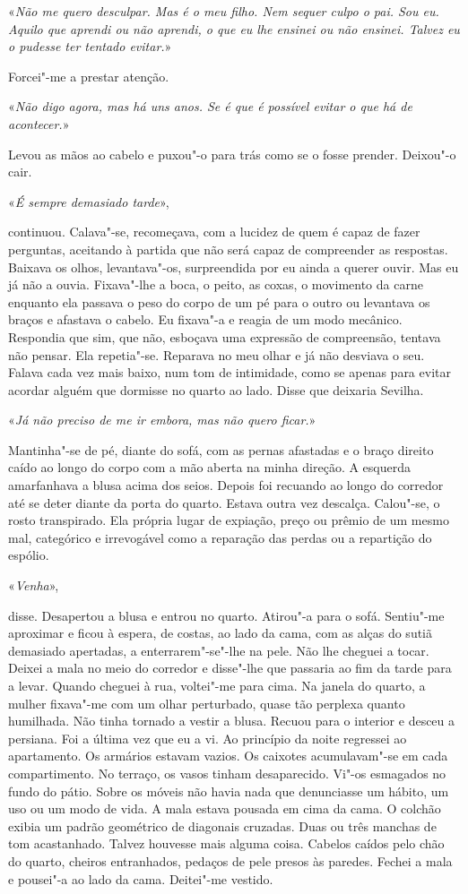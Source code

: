 «\emph{Não me quero desculpar. Mas é o meu filho. Nem sequer culpo o
pai. Sou eu. Aquilo que aprendi ou não aprendi, o que eu lhe ensinei ou
não ensinei. Talvez eu o pudesse ter tentado evitar.}»

Forcei"-me a prestar atenção.

«\emph{Não digo agora, mas há uns anos. Se é que é possível evitar o que
há de acontecer.}»

Levou as mãos ao cabelo e puxou"-o para trás como se o fosse prender.
Deixou"-o cair.

«\emph{É sempre demasiado tarde}»,

continuou. Calava"-se, recomeçava, com a lucidez de quem é capaz de
fazer perguntas, aceitando à partida que não será capaz de compreender
as respostas. Baixava os olhos, levantava"-os, surpreendida por eu ainda
a querer ouvir. Mas eu já não a ouvia. Fixava"-lhe a boca, o peito, as
coxas, o movimento da carne enquanto ela passava o peso do corpo de um
pé para o outro ou levantava os braços e afastava o cabelo. Eu fixava"-a
e reagia de um modo mecânico. Respondia que sim, que não, esboçava uma
expressão de compreensão, tentava não pensar. Ela repetia"-se. Reparava
no meu olhar e já não desviava o seu. Falava cada vez mais baixo, num
tom de intimidade, como se apenas para evitar acordar alguém que
dormisse no quarto ao lado. Disse que deixaria Sevilha.

«\emph{Já não preciso de me ir embora, mas não quero ficar.}»

Mantinha"-se de pé, diante do sofá, com as pernas afastadas e o braço
direito caído ao longo do corpo com a mão aberta na minha direção. A
esquerda amarfanhava a blusa acima dos seios. Depois foi recuando ao
longo do corredor até se deter diante da porta do quarto. Estava outra
vez descalça. Calou"-se, o rosto transpirado. Ela própria lugar de
expiação, preço ou prêmio de um mesmo mal, categórico e irrevogável como
a reparação das perdas ou a repartição do espólio.

«\emph{Venha}»,

disse. Desapertou a blusa e entrou no quarto. Atirou"-a para o sofá.
Sentiu"-me aproximar e ficou à espera, de costas, ao lado da cama, com
as alças do sutiã demasiado apertadas, a enterrarem"-se"-lhe na pele.
Não lhe cheguei a tocar. Deixei a mala no meio do corredor e disse"-lhe
que passaria ao fim da tarde para a levar. Quando cheguei à rua,
voltei"-me para cima. Na janela do quarto, a mulher fixava"-me com um
olhar perturbado, quase tão perplexa quanto humilhada. Não tinha tornado
a vestir a blusa. Recuou para o interior e desceu a persiana. Foi a última
vez que eu a vi. Ao princípio da noite regressei ao apartamento. Os
armários estavam vazios. Os caixotes acumulavam"-se em cada
compartimento. No terraço, os vasos tinham desaparecido. Vi"-os
esmagados no fundo do pátio. Sobre os móveis não havia nada que
denunciasse um hábito, um uso ou um modo de vida.
A mala estava pousada em cima da cama. O colchão exibia um padrão
geométrico de diagonais cruzadas. Duas ou três manchas de tom
acastanhado. Talvez houvesse mais alguma coisa. Cabelos caídos pelo chão
do quarto, cheiros entranhados, pedaços de pele presos às paredes.
Fechei a mala e pousei"-a ao lado da cama. Deitei"-me vestido.

